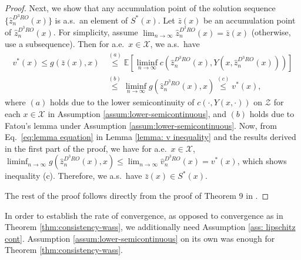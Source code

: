 \documentclass[onefignum,onetabnum]{siamart251216}
\begin{document}
\begin{proof}
    Next, we show that any accumulation point of the solution sequence $\{\hat{z}_n^{D^3RO}(x)\}$ is a.s.\ an element of $S^*(x)$. 
    Let $\bar{z}(x)$ be an accumulation point of $\hat{z}_n^{D^3RO}(x)$. For simplicity, assume $\lim_{n\rightarrow \infty} \hat{z}_n^{D^3RO}(x)=\bar{z}(x)$ (otherwise, use a subsequence). Then for a.e.\ $ x \in \mathcal{X}$, we a.s.\ have
    \begin{align}
    v^*(x) \leq g(\bar{z}(x),x) & \overset{(a)}{\le} \mathbb{E}\left[\liminf_{n \rightarrow \infty} c(\hat{z}_n^{D^3RO}(x),Y(x,\hat{z}_n^{D^3RO}(x)))\right] \nonumber 
    \\
    & \overset{(b)}{\le} \liminf_{n \rightarrow \infty} g(\hat{z}_n^{D^3RO}(x),x) \overset{(c)}\leq v^*(x), \nonumber %
    \end{align}
    where $(a)$ holds due to the lower semicontinuity of $c(\cdot,Y(x,\cdot))$ on $\mathcal{Z}$ for each $x \in \mathcal{X}$ in Assumption \ref{assum:lower-semicontinuous}, and $(b)$ holds due to Fatou's lemma under Assumption \ref{assum:lower-semicontinuous}. Now, from Eq.\ \eqref{eq:lemma equation} in Lemma \ref{lemma: v inequality} and the results derived in the first part of the proof, we have for a.e.\ $ x \in \mathcal{X}$, $\liminf_{n \rightarrow \infty} g(\hat{z}_n^{D^3RO}(x),x) \leq \lim_{n \rightarrow \infty}\hat{v}_n^{D^3RO}(x) = v^*(x)$, which shows inequality (c).    
    Therefore, we a.s.\ have $\bar{z}(x) \in S^*(x)$. 

    The rest of the proof follows directly from the proof of Theorem 9 in \cite{kannan2020residuals}. 
\end{proof}

In order to establish the rate of convergence, as opposed to convergence as in Theorem \ref{thm:consistency-wass}, we additionally need Assumption \ref{ass: lipschitz cont}. Assumption \ref{assum:lower-semicontinuous} on its own was enough for Theorem \ref{thm:consistency-wass}. 
\end{document}
